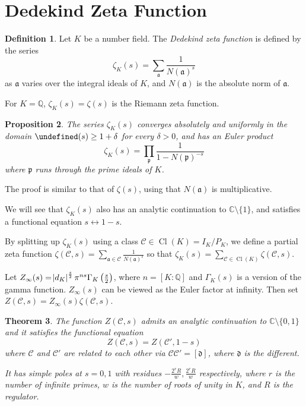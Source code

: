 \documentclass[11pt]{article}
\theoremstyle{definition}
\newtheorem{definition}{Definition}[section]
\theoremstyle{plain}
\newtheorem{theorem}[definition]{Theorem}
\newtheorem{proposition}[definition]{Proposition}
\theoremstyle{remark}
\let\Re\undefined
\DeclareMathOperator{\Re}{Re}
\DeclareMathOperator{\Cl}{Cl}
\newcommand{\QQ}{\mathbb{Q}}
\newcommand{\CC}{\mathbb{C}}
\newcommand{\cC}{\mathcal{C}}
\newcommand{\fa}{\mathfrak{a}}
\newcommand{\fd}{\mathfrak{d}}
\newcommand{\fp}{\mathfrak{p}}
\begin{document}
\section{Dedekind Zeta Function}

\begin{definition}\label{def:6_1}
    Let $K$ be a number field. The \emph{Dedekind zeta function} is defined by the series
    \begin{equation*}
        \zeta_K(s) = \sum_{\fa} \frac{1}{N(\fa)^s}
    \end{equation*}
    as $\fa$ varies over the integral ideals of $K$, and $N(\fa)$ is the absolute norm of $\fa$.
\end{definition}

For $K=\QQ$, $\zeta_K(s) = \zeta(s)$ is the Riemann zeta function.

\begin{proposition}\label{prop:6_2}
    The series $\zeta_K(s)$ converges absolutely and uniformly in the domain $\Re(s) \ge 1+\delta$ for every $\delta > 0$, and has an Euler product
    \begin{equation*}
        \zeta_K(s) = \prod_{\fp} \frac{1}{1 - N(\fp)^{-s}}
    \end{equation*}
    where $\fp$ runs through the prime ideals of $K$.
\end{proposition}
\noindent The proof is similar to that of $\zeta(s)$, using that $N(\fa)$ is multiplicative.

We will see that $\zeta_K(s)$ also has an analytic continuation to $\CC \setminus \{1\}$, and satisfies a functional equation $s \longleftrightarrow 1-s$.

By splitting up $\zeta_K(s)$ using a class $\cC \in \Cl(K) = I_K/P_K$, we define a partial zeta function $\zeta(\cC, s) = \sum_{\fa \in \cC} \frac{1}{N(\fa)^s}$ so that $\zeta_K(s) = \sum_{\cC \in \Cl(K)} \zeta(\cC, s)$.

Let $Z_\infty(s) = \abs{d_K}^{\frac{s}{2}} \pi^{ns} \Gamma_K\left(\frac{s}{2}\right)$, where $n = [K:\QQ]$ and $\Gamma_K(s)$ is a version of the gamma function. $Z_\infty(s)$ can be viewed as the Euler factor at infinity. Then set $Z(\cC, s) = Z_\infty(s) \zeta(\cC, s)$.

\begin{theorem}\label{thm:6_3}
    The function $Z(\cC, s)$ admits an analytic continuation to $\CC \setminus \{0, 1\}$ and it satisfies the functional equation
    \begin{equation*}
        Z(\cC, s) = Z(\cC', 1-s)
    \end{equation*}
    where $\cC$ and $\cC'$ are related to each other via $\cC \cC' = [\fd]$, where $\fd$ is the different.

    It has simple poles at $s=0,1$ with residues $-\frac{2^r R}{w}, \frac{2^r R}{w}$ respectively, where $r$ is the number of infinite primes, $w$ is the number of roots of unity in $K$, and $R$ is the regulator.
\end{theorem}
\end{document}
